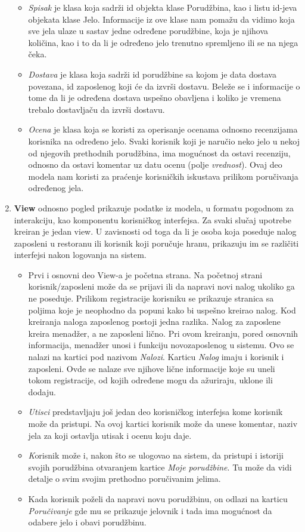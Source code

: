 \begin{enumerate}
\begin{itemize}
         \item \emph{Spisak} je klasa koja sadrži id objekta klase Porudžbina, kao i listu id-jeva objekata klase Jelo. Informacije iz ove klase nam pomažu da vidimo koja sve jela ulaze u sastav jedne određene porudžbine, koja je njihova količina, kao i to da li je određeno jelo trenutno spremljeno ili se na njega čeka.
         \item \emph{Dostava} je klasa koja sadrži id porudžbine sa kojom je data dostava povezana, id zaposlenog koji će da izvrši dostavu. Beleže se i informacije o tome da li je određena dostava uspešno obavljena i koliko je vremena trebalo dostavljaču da izvrši dostavu. 
         \item \emph{Ocena} je klasa koja se koristi za operisanje ocenama odnosno recenzijama korisnika na određeno jelo. Svaki korisnik koji je naručio neko jelo u nekoj od njegovih prethodnih porudžbina, ima mogućnost da ostavi recenziju, odnosno da ostavi komentar uz datu ocenu (polje \emph{vrednost}). Ovaj deo modela nam koristi za praćenje korisničkih iskustava prilikom poručivanja određenog jela.
    \end{itemize}
    \item \textbf{View} odnosno pogled prikazuje podatke iz modela, u formatu pogodnom za interakciju, kao komponentu korisničkog interfejsa. Za svaki slučaj upotrebe kreiran je jedan view. U zavisnosti od toga da li je osoba koja poseduje nalog zaposleni u restoranu ili korisnik koji poručuje hranu, prikazuju im se različiti interfejsi nakon logovanja na sistem. 
    \begin{itemize} 
    \item Prvi i osnovni deo View-a je početna strana. Na početnoj strani korisnik/zaposleni može da se prijavi ili da napravi novi nalog ukoliko ga ne poseduje. Prilikom registracije korisniku se prikazuje stranica sa poljima koje je neophodno da popuni kako bi uspešno kreirao nalog. Kod kreiranja naloga zaposlenog postoji jedna razlika. Nalog za zaposlene kreira menadžer, a ne zaposleni lično. Pri ovom kreiranju, pored osnovnih informacija, menadžer unosi i funkciju novozaposlenog u sistemu. Ovo se nalazi na kartici pod nazivom \emph{Nalozi}. Karticu \emph{Nalog} imaju i korisnik i zaposleni. Ovde se nalaze sve njihove lične informacije koje su uneli tokom registracije, od kojih određene mogu da ažuriraju, uklone ili dodaju.
    \item \emph{Utisci} predstavljaju još jedan deo korisničkog interfejsa kome korisnik može da pristupi. Na ovoj kartici korisnik može da unese komentar, naziv jela za koji ostavlja utisak i ocenu koju daje.
    \item \emph Korisnik može i, nakon što se ulogovao na sistem, da pristupi i istoriji svojih porudžbina otvaranjem kartice \emph{Moje porudžbine}. Tu može da vidi detalje o svim svojim prethodno poručivanim jelima.
    \item Kada korisnik poželi da napravi novu porudžbinu, on odlazi na karticu \emph{Poručivanje} gde mu se prikazuje jelovnik i tada ima mogućnost da odabere jelo i obavi porudžbinu.
    

\end{itemize}
\end{enumerate}
